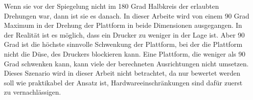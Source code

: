 \smallskip

Wenn sie vor der Spiegelung nicht im 180 Grad Halbkreis der erlaubten Drehungen war, dann ist sie es danach. In dieser Arbeite wird von einem 90 Grad Maximum in der Drehung der Plattform in beide Dimensionen ausgegangen. In der Realität ist es möglich, 
dass ein Drucker zu weniger in der Lage ist. Aber 90 Grad ist die höchste sinnvolle Schwenkung der Plattform, bei der die Plattform nicht die Düse, des Druckers blockieren kann. Eine Plattform, die weniger als 90 Grad schwenken kann, kann viele der 
berechneten Ausrichtungen nicht umsetzen. Dieses Szenario wird in dieser Arbeit nicht betrachtet, da nur bewertet werden soll wie praktikabel der Ansatz ist, Hardwareeinschränkungen sind dafür zuerst zu vernachlässigen.

